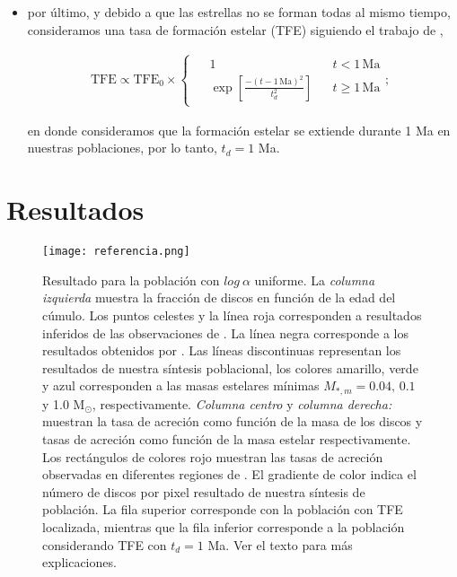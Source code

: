 \documentclass[baaa]{baaa}
\begin{document}
\begin{itemize}
\item por \'ultimo, y debido a que las estrellas no se forman todas al mismo tiempo, consideramos una tasa de formación estelar (TFE) siguiendo el trabajo de \cite{coleman2022dispersal},


\begin{align}
    \mathrm{TFE} \propto \mathrm{TFE}_{0} \times 
    \begin{cases}
        \begin{aligned}
            &1 && t < 1\,\text{Ma} \\ 
            &\exp \left[ \frac{-(t-1\,\text{Ma})^{2}}{t^{2}_{d}} \right] && t \geq 1\,\text{Ma}
        \end{aligned}
        ;
    \end{cases}    
    \label{eq:TFE}
\end{align}

en donde consideramos que la formación estelar se extiende durante 1 Ma en nuestras poblaciones, por lo tanto, $t_{d}=1$ Ma. 

\end{itemize}

\section{Resultados}

\begin{figure*}[!ht]
\centering
\texttt{[image: referencia.png]}
\caption{Resultado para la población con $log ~ \alpha $ uniforme. La \emph{columna izquierda} muestra la fracción de discos en función de la edad del c\'umulo. Los puntos celestes y la línea roja corresponden a resultados inferidos de las observaciones de \cite{Pfalzner_2022}. La línea negra corresponde a los resultados obtenidos por \cite{MamajekE}. Las líneas discontinuas representan los resultados de nuestra síntesis poblacional, los colores amarillo, verde y azul corresponden a las masas estelares mínimas $M_{*,m}=0.04,\,0.1$ y 1.0 M$_{\odot}$, respectivamente. \emph{Columna centro} y \emph{columna derecha:} muestran la tasa de acreción como función de la masa de los discos y tasas de acreción como función de la masa estelar respectivamente. Los rect\'angulos de colores rojo muestran las tasas de acreción observadas en diferentes regiones de \cite{manara2023ASPC}. El gradiente de color indica el n\'umero de discos por pixel resultado de nuestra síntesis de población. La fila superior corresponde con la población con TFE localizada, mientras que la fila inferior corresponde a la población considerando TFE con $t_{d} = 1$ Ma. Ver el texto para más explicaciones. }
\label{Figura:resultado1}
\end{figure*}
\end{document}
